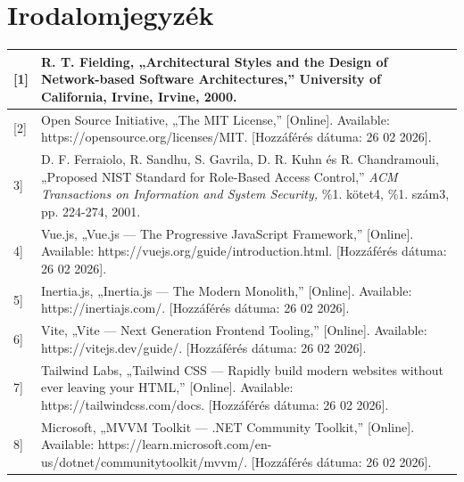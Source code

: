 \chapter{Irodalomjegyzék}\label{irodalomjegyzuxe9k}

{\def\LTcaptype{} %
\begin{longtable}[]{@{}
  >{\raggedright\arraybackslash}p{}
  >{\raggedright\arraybackslash}p{}@{}}
\toprule\noalign{}
\begin{minipage}[b]{\linewidth}\raggedright
{[}1{]}
\end{minipage} & \begin{minipage}[b]{\linewidth}\raggedright
R. T. Fielding, „Architectural Styles and the Design of Network-based Software Architectures,'' University of California, Irvine, Irvine, 2000.
\end{minipage} \\
\midrule\noalign{}
\endhead
\bottomrule\noalign{}
\endlastfoot
{[}2{]} & Open Source Initiative, „The MIT License,'' {[}Online{]}. Available: https://opensource.org/licenses/MIT. {[}Hozzáférés dátuma: 26 02 2026{]}. \\
{[}3{]} & D. F. Ferraiolo, R. Sandhu, S. Gavrila, D. R. Kuhn és R. Chandramouli, „Proposed NIST Standard for Role-Based Access Control,'' \emph{ACM Transactions on Information and System Security,} \%1. kötet4, \%1. szám3, pp. 224-274, 2001. \\
{[}4{]} & Vue.js, „Vue.js --- The Progressive JavaScript Framework,'' {[}Online{]}. Available: https://vuejs.org/guide/introduction.html. {[}Hozzáférés dátuma: 26 02 2026{]}. \\
{[}5{]} & Inertia.js, „Inertia.js --- The Modern Monolith,'' {[}Online{]}. Available: https://inertiajs.com/. {[}Hozzáférés dátuma: 26 02 2026{]}. \\
{[}6{]} & Vite, „Vite --- Next Generation Frontend Tooling,'' {[}Online{]}. Available: https://vitejs.dev/guide/. {[}Hozzáférés dátuma: 26 02 2026{]}. \\
{[}7{]} & Tailwind Labs, „Tailwind CSS --- Rapidly build modern websites without ever leaving your HTML,'' {[}Online{]}. Available: https://tailwindcss.com/docs. {[}Hozzáférés dátuma: 26 02 2026{]}. \\
{[}8{]} & Microsoft, „MVVM Toolkit --- .NET Community Toolkit,'' {[}Online{]}. Available: https://learn.microsoft.com/en-us/dotnet/communitytoolkit/mvvm/. {[}Hozzáférés dátuma: 26 02 2026{]}. \\

\end{longtable}}
